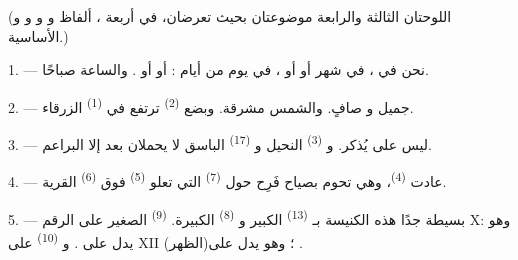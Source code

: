 %

\VUsaut{3.0mm}
\VUsaut{1.6mm}
\VUsaut{3.4mm}

(اللوحتان الثالثة والرابعة موضوعتان بحيث تعرضان، في أربعة
، ألفاظ  و
و و و الأساسية.)
\VUsaut{4.0mm}

\VUsaut{3.0mm}

\VUsaut{2.4mm}

\VUsaut{3.0mm}

1. --- نحن في ، في شهر  أو  أو
، في يوم من أيام :  أو
 أو . والساعة  صباحًا.

2. ---  جميل و صافٍ. والشمس مشرقة. وبضع
 \textsuperscript{(2)} ترتفع في  \textsuperscript{(1)}
الزرقاء.

3. --- ليس على   يُذكر. و
\textsuperscript{(3)} النحيل و \textsuperscript{(17)} الباسق لا
يحملان بعد إلا البراعم.

4. --- عادت  \textsuperscript{(4)}، وهي تحوم بصياح فَرِح حول
 \textsuperscript{(7)} التي تعلو 
\textsuperscript{(5)} فوق  \textsuperscript{(6)} القرية.

\VUsaut{3.4mm}
\VUsaut{3.0mm}

5. --- بسيطة جدًا هذه الكنيسة بـ \textsuperscript{(13)} الكبير
و \textsuperscript{(8)} الكبيرة.  \textsuperscript{(9)}
الصغير على الرقم X: وهو يدل على . و
\textsuperscript{(10)} على XII (الظهر)؛ وهو يدل على .


